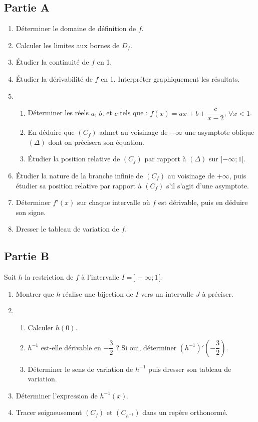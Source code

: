\documentclass[12pt]{article}
\begin{document}
\subsection*{Partie A}

\begin{enumerate}
    \item Déterminer le domaine de définition de $f$.
    \item Calculer les limites aux bornes de $D_f$.
    \item Étudier la continuité de $f$ en 1.
    \item Étudier la dérivabilité de $f$ en 1. Interpréter graphiquement les résultats.
    \item 
    \begin{enumerate}
        \item Déterminer les réels $a$, $b$, et $c$ tels que : $f(x) = ax + b + \dfrac{c}{x-2}$, $\forall x < 1$.
        \item En déduire que $(C_f)$ admet au voisinage de $-\infty$ une asymptote oblique $(\Delta)$ dont on précisera son équation.
        \item Étudier la position relative de $(C_f)$ par rapport à $(\Delta)$ sur ]$-\infty ; 1[$.
    \end{enumerate}
    \item Étudier la nature de la branche infinie de $(C_f)$ au voisinage de $+\infty$, puis étudier sa position relative par rapport à $(C_f)$ s'il s'agit d'une asymptote.
    \item Déterminer $f'(x)$ sur chaque intervalle où $f$ est dérivable, puis en déduire son signe.
    \item Dresser le tableau de variation de $f$.
\end{enumerate}

\subsection*{Partie B}


Soit $h$ la restriction de $f$ à l’intervalle $I = ]-\infty; 1[$.
\begin{enumerate}
    \item Montrer que $h$ réalise une bijection de $I$ vers un intervalle $J$ à préciser.
    \item 
    \begin{enumerate}
        \item Calculer $h(0)$.
        \item $h^{-1}$ est-elle dérivable en $-\dfrac{3}{2}$ ? Si oui, déterminer $(h^{-1})'\left(-\dfrac{3}{2}\right)$.
        \item Déterminer le sens de variation de $h^{-1}$ puis dresser son tableau de variation.
    \end{enumerate}
    \item Déterminer l’expression de $h^{-1}(x)$.
    \item Tracer soigneusement $(C_f)$ et $(C_{h^{-1}})$ dans un repère orthonormé.
\end{enumerate}
\end{document}
